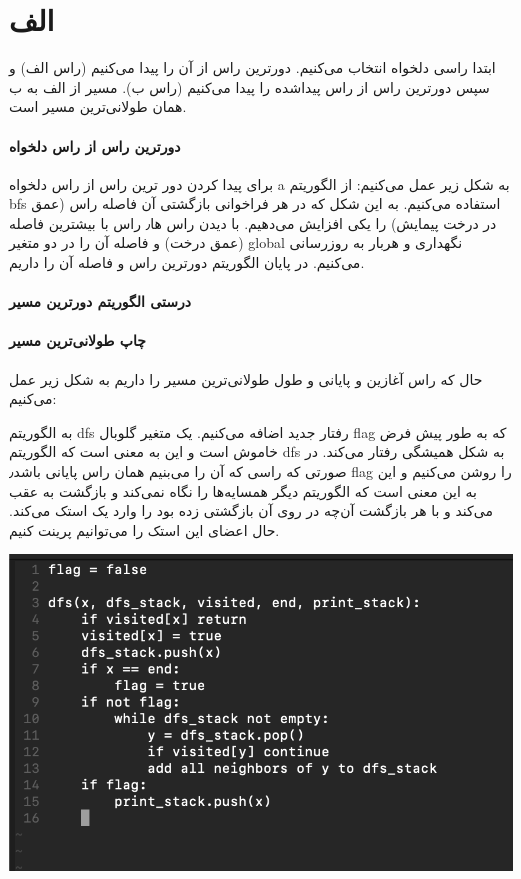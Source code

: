 \section*{الف}
ابتدا راسی دلخواه انتخاب می‌کنیم. دورترین راس از‌ آن را پیدا می‌کنیم 
(راس الف)
و سپس دورترین راس از راس پیداشده را پیدا می‌کنیم 
(راس ب). 
مسیر از الف به ب همان طولانی‌ترین مسیر است.

\paragraph{دورترین راس از راس دلخواه}
برای پیدا کردن دور ترین راس از راس دلخواه‌ a به شکل زیر عمل می‌کنیم:
از الگوریتم bfs استفاده می‌کنیم. به این شکل که در هر فراخوانی بازگشتی آن فاصله راس (عمق در درخت پیمایش) را یکی افزایش می‌دهیم. با دیدن راس ها٫ راس با بیشترین فاصله (عمق درخت) و فاصله آن را در دو متغیر global نگهداری و هربار به روزرسانی می‌کنیم. در پایان الگوریتم دورترین راس و فاصله آن را داریم.

\paragraph{
درستی الگوریتم دورترین مسیر
}

\paragraph{
چاپ طولانی‌ترین مسیر
}
حال که راس آغازین و پایانی و طول طولانی‌ترین مسیر را داریم به شکل زیر عمل 
می‌کنیم:

به الگوریتم dfs رفتار جدید اضافه می‌کنیم. یک متغیر گلوبال flag که به طور پیش فرض خاموش است و این به معنی است که الگوریتم dfs به شکل همیشگی رفتار می‌کند. در صورتی که راسی که آن را می‌بنیم همان راس پایانی باشد٫  flag را روشن می‌کنیم و این به این معنی است که الگوریتم دیگر همسایه‌ها را نگاه نمی‌کند و بازگشت به عقب می‌کند و با هر بازگشت آن‌چه در روی آن بازگشتی زده بود را وارد یک استک می‌کند. 
حال اعضای این استک را می‌توانیم پرینت کنیم.

\includegraphics{5-1}


